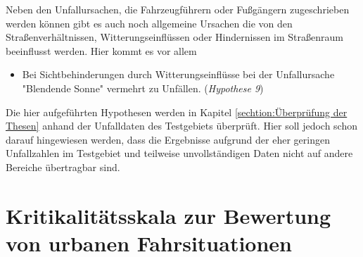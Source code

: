 Neben den Unfallursachen, die Fahrzeugführern oder Fußgängern zugeschrieben werden können gibt es auch noch allgemeine Ursachen die von den Straßenverhältnissen, Witterungseinflüssen oder Hindernissen im Straßenraum beeinflusst werden. Hier kommt es vor allem 

\begin{itemize}	
	\item Bei Sichtbehinderungen durch Witterungseinflüsse bei der Unfallursache "Blendende Sonne" vermehrt zu Unfällen. (\textit{Hypothese 9})
\end{itemize}

Die hier aufgeführten Hypothesen werden in Kapitel \ref{sechtion:Überprüfung der Thesen} anhand der Unfalldaten des Testgebiets überprüft. Hier soll jedoch schon darauf hingewiesen werden, dass die Ergebnisse aufgrund der eher geringen Unfallzahlen im Testgebiet und teilweise unvollständigen Daten nicht auf andere Bereiche übertragbar sind. %


\section{Kritikalitätsskala zur Bewertung von urbanen Fahrsituationen}







